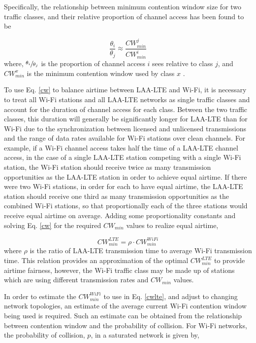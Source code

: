 Specifically, the relationship between minimum contention window size for two traffic classes, and their relative proportion of channel access has been found to be

\begin{equation}\label{cw}
\frac{\theta_i}{\theta_j} \approx \frac{CW^j_{min}}{CW^i_{min}}
\end{equation}
where, $\sfrac{\theta_i}{\theta_j}$ is the proportion of channel access $i$ sees relative to class $j$, and $CW^x_{min}$ is the minimum contention window used by class $x$ \cite{chou}\cite{yoon}.  

To use Eq. \ref{cw} to balance airtime between \mbox{LAA-LTE} and \mbox{Wi-Fi}, it is necessary to treat all \mbox{Wi-Fi} stations and all LAA-LTE networks as single traffic classes and account for the duration of channel access for each class. Between the two traffic classes, this duration will generally be significantly longer for LAA-LTE than for Wi-Fi due to the synchronization between licensed and unlicensed transmissions and the range of data rates available for Wi-Fi stations over clean channels. For example, if a \mbox{Wi-Fi} channel access takes half the time of a \mbox{LAA-LTE} channel access, in the case of a single \mbox{LAA-LTE} station competing with a single \mbox{Wi-Fi} station, the \mbox{Wi-Fi} station should receive twice as many transmission opportunities as the \mbox{LAA-LTE} station in order to achieve equal airtime.  If there were two \mbox{Wi-Fi} stations, in order for each to have equal airtime, the \mbox{LAA-LTE} station should receive one third as many transmission opportunities as the combined \mbox{Wi-Fi} stations, so that proportionally each of the three stations would receive equal airtime on average.  Adding some proportionality constants and solving Eq. \ref{cw} for the required $CW_{min}$ values to realize equal airtime,

\begin{equation}\label{cwlte}
CW^{LTE}_{min} = \rho\cdot{CW^{WiFi}_{min}}
\end{equation}
where $\rho$ is the ratio of \mbox{LAA-LTE} transmission time to average \mbox{Wi-Fi} transmission time.  This relation provides an approximation of the optimal $CW^{LTE}_{min}$ to provide airtime fairness, however, the \mbox{Wi-Fi} traffic class may be made up of stations which are using different transmission rates and $CW_{min}$ values.  

In order to estimate the $CW^{WiFi}_{min}$ to use in Eq. \ref{cwlte}, and adjust to changing network topologies, an estimate of the average current Wi-Fi contention window being used is required.  Such an estimate can be obtained from the relationship between contention window and the probability of collision. For \mbox{Wi-Fi} networks, the probability of collision, $p$, in a saturated network is given by, 

